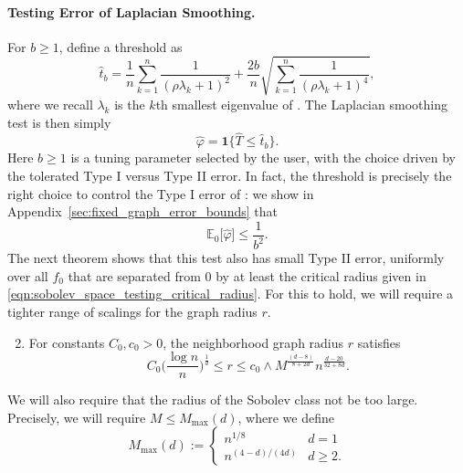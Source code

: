 \documentclass[twoside]{article}
\newcommand{\1}{\mathbf{1}}
\newcommand{\Ebb}{\mathbb{E}}
\newcommand{\wh}[1]{\widehat{#1}}
\theoremstyle{definition}
\theoremstyle{remark}
\begin{document}
\paragraph{Testing Error of Laplacian Smoothing.}

For $b \geq 1$, define a threshold \smash{$\wh{t}_b$} as
\begin{equation*}
\wh{t}_{b} = \frac{1}{n}\sum_{k = 1}^{n} \frac{1}{(\rho \lambda_k + 1)^2} + \frac{2b}{n}\sqrt{\sum_{k = 1}^{n} \frac{1}{(\rho \lambda_k + 1)^4}},
\end{equation*}
where we recall $\lambda_k$ is the $k$th smallest eigenvalue of . The Laplacian smoothing test is then simply
\begin{equation*}
\wh{\varphi} = \1\bigl\{\wh{T} \leq \wh{t}_b\bigr\}.
\end{equation*} 
Here $b \geq 1$ is a tuning parameter selected by the user, with the choice driven by the tolerated Type I versus Type II error. In fact, the threshold \smash{$\wh{t}_b$} is precisely the right choice to control the Type I error of \smash{$\wh{\varphi}$}: we show in Appendix~\ref{sec:fixed_graph_error_bounds} that
\begin{equation}
\label{eqn:type_I_error}
\Ebb_0\bigl[\wh{\varphi}\bigr] \leq \frac{1}{b^2}.
\end{equation}
The next theorem shows that this test also has small Type II error, uniformly over all $f_0$ that are separated from $0$ by at least the critical radius given in \eqref{eqn:sobolev_space_testing_critical_radius}. For this to hold, we will require a tighter range of scalings for the graph radius $r$.
\begin{enumerate}[label=(R\arabic*)]
	\setcounter{enumi}{1}
	\item 
	\label{asmp:ls_kernel_radius_testing}
	For constants $C_0,c_0>0$, the neighborhood graph radius $r$ satisfies
	\begin{equation*}
	C_0\biggl(\frac{\log n}{n}\biggr)^{\frac{1}{d}} \leq r \leq c_0 \wedge M^{\frac{(d - 8)}{8 + 2d}} n^{\frac{d - 20}{32 + 8d}}.
	\end{equation*}
\end{enumerate}
We will also require that the radius of the Sobolev class not be too large. Precisely, we will require $M \leq M_{\max}(d)$, where we define
\begin{equation*}
M_{\max}(d) :=
\begin{cases*}
n^{1/8} & \textrm{$d = 1$} \\
n^{(4 - d)/(4d)} & \textrm{$d \geq 2$}.
\end{cases*}
\end{equation*}
\end{document}
